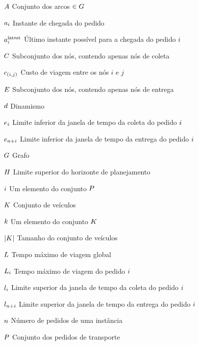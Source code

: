 


\begin{simbolos}
    \item[$A$]{Conjunto dos arcos $\in G$}
  \item[$a_i$] Instante de chegada do pedido \request
    \item[$a{}_{i{}}^{\mathrm{latest}}$]
      Último instante possível para a chegada do pedido $i$
    \item[$C$] Subconjunto dos nós, contendo apenas nós de coleta
    \item[$c_{(i,j)}$] Custo de viagem entre os nós $i$ e $j$
    \item[$E$] Subconjunto dos nós, contendo apenas nós de entrega
    \item[$d$] Dinamismo
    \item[$e_{i}$]
      Limite inferior da janela de tempo da coleta do pedido $i$
    \item[$e_{n + i}$]
      Limite inferior da janela de tempo da entrega do pedido $i$
    \item[$G$] Grafo
    \item[$H$] Limite superior do horizonte de planejamento
    \item[$i$] Um elemento do conjunto $P$
    \item[$K$] Conjunto de veículos
    \item[$k$] Um elemento do conjunto $K$
    \item[$|K|$] Tamanho do conjunto de veículos
    \item[$L$] Tempo máximo de viagem global
    \item[$L_i$] Tempo máximo de viagem do pedido 
      $i$
    \item[$l_{i}$]
      Limite superior da janela de tempo da coleta do pedido $i$
    \item[$l_{n + i}$]
      Limite superior da janela de tempo da entrega do pedido $i$
    \item[$n$] Número de pedidos de uma instância
    \item[$P$] Conjunto dos pedidos de transporte 

\end{simbolos}
